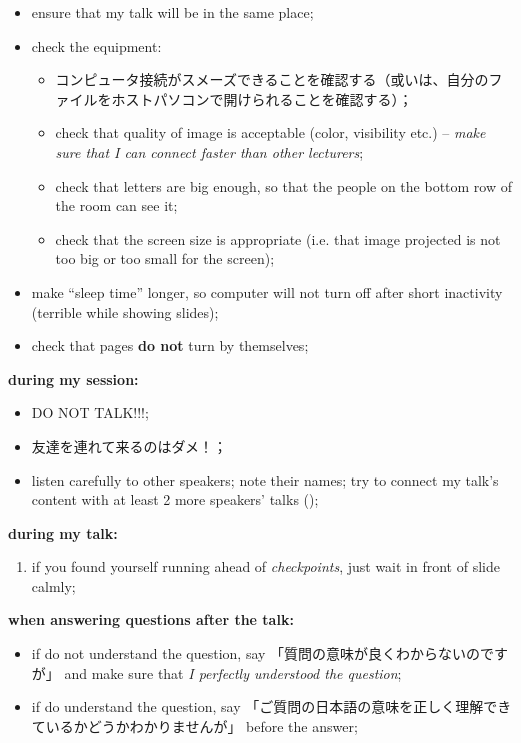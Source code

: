 \documentclass[12pt]{article} %
\begin{document}
	\begin{itemize}
		\item ensure that my talk will be in the same place;
		\item check the equipment:\begin{itemize}
				\item コンピュータ接続がスメーズできることを確認する（或いは、自分のファイルをホストパソコンで開けられることを確認する）；
				\item check that quality of image is acceptable (color, visibility etc.) -- \textit{make sure that I can connect faster than other lecturers};
				\item check that letters are big enough, so that the people on the bottom row of the room can see it;
				\item check that the screen size is appropriate (i.e. that image projected is not too big or too small for the screen);
			\end{itemize}
		\item make ``sleep time'' longer, so computer will not turn off after short inactivity (terrible while showing slides);
		\item check that pages {\bf do not} turn by themselves;
	\end{itemize}
	\textbf{during my session:}
	\begin{itemize}
		\item DO NOT TALK!!!;
		\item 友達を連れて来るのはダメ！；
		\item listen carefully to other speakers; note their names; try to connect my talk's content with at least 2 more speakers' talks ();
	\end{itemize}
    \textbf{during my talk:}\begin{enumerate}
        \item if you found yourself running ahead of {\it checkpoints}, just wait in front of slide calmly;
    \end{enumerate}
	\textbf{when answering questions after the talk:}
	\begin{itemize}
		\item if do not understand the question, say 「質問の意味が良くわからないのですが」 and make sure that \textit{I perfectly understood the question};
		\item if do understand the question, say 「ご質問の日本語の意味を正しく理解できているかどうかわかりませんが」 before the answer;
	\end{itemize}
\end{document}
